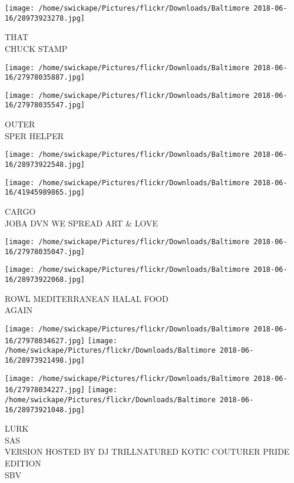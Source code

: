 \documentclass[10pt,letterpaper]{article}
\begin{document}
\vspace{0.25in}
\texttt{[image: /home/swickape/Pictures/flickr/Downloads/Baltimore 2018-06-16/28973923278.jpg]}

THAT\\
CHUCK STAMP\\
\pagebreak

\texttt{[image: /home/swickape/Pictures/flickr/Downloads/Baltimore 2018-06-16/27978035887.jpg]}

\vspace{0.25in}
\texttt{[image: /home/swickape/Pictures/flickr/Downloads/Baltimore 2018-06-16/27978035547.jpg]}

OUTER\\
SPER HELPER\\
\pagebreak

\texttt{[image: /home/swickape/Pictures/flickr/Downloads/Baltimore 2018-06-16/28973922548.jpg]}

\vspace{0.25in}
\texttt{[image: /home/swickape/Pictures/flickr/Downloads/Baltimore 2018-06-16/41945989865.jpg]}

CARGO\\
JOBA DVN WE SPREAD ART \& LOVE\\
\pagebreak

\texttt{[image: /home/swickape/Pictures/flickr/Downloads/Baltimore 2018-06-16/27978035047.jpg]}

\vspace{0.25in}
\texttt{[image: /home/swickape/Pictures/flickr/Downloads/Baltimore 2018-06-16/28973922068.jpg]}

ROWL MEDITERRANEAN HALAL FOOD\\
AGAIN\\
\pagebreak

\texttt{[image: /home/swickape/Pictures/flickr/Downloads/Baltimore 2018-06-16/27978034627.jpg]}
\texttt{[image: /home/swickape/Pictures/flickr/Downloads/Baltimore 2018-06-16/28973921498.jpg]}

\texttt{[image: /home/swickape/Pictures/flickr/Downloads/Baltimore 2018-06-16/27978034227.jpg]}
\texttt{[image: /home/swickape/Pictures/flickr/Downloads/Baltimore 2018-06-16/28973921048.jpg]}

LURK\\
SAS\\
VERSION HOSTED BY DJ TRILLNATURED KOTIC COUTURER PRIDE EDITION\\
SBV\\
\pagebreak
\end{document}
